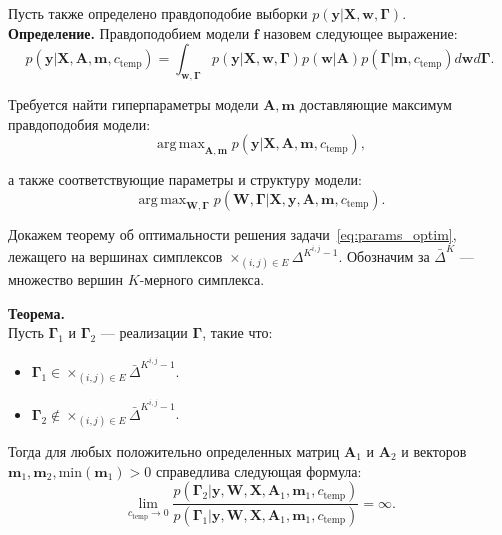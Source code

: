 \documentclass[12pt]{article}
\DeclareMathOperator*{\argmax}{arg\,max}
\begin{document}
Пусть также определено правдоподобие выборки $p(\mathbf{y}|\mathbf{X}, \mathbf{w}, \boldsymbol{\Gamma}).$\\
\textbf{Определение.} Правдоподобием модели $\mathbf{f}$ назовем следующее выражение: 
\begin{equation}
\label{eq:evidence}
	p(\mathbf{y}|\mathbf{X},\mathbf{A},\mathbf{m}, c_{\text{temp}}) = \int_{\mathbf{w}, \boldsymbol{\Gamma} } p(\mathbf{y}|\mathbf{X},\mathbf{w},  \boldsymbol{\Gamma})p(\mathbf{w}|\mathbf{A})p(\boldsymbol{\Gamma}|\mathbf{m}, c_{\text{temp}})d\mathbf{w}d\mathbf{\Gamma}.
\end{equation}

Требуется найти гиперпараметры модели $\mathbf{A}, \mathbf{m}$ доставляющие максимум правдоподобия модели:
\begin{equation}
\label{eq:evidence_optim}
    \argmax_{\mathbf{A}, \mathbf{m}}  p(\mathbf{y}|\mathbf{X},\mathbf{A},\mathbf{m}, {c_\text{temp}}),
\end{equation}

а также соответствующие параметры и структуру модели:
\begin{equation}
\label{eq:params_optim}
    \argmax_{\mathbf{W}, \boldsymbol{\Gamma}}  p(\mathbf{W}, \boldsymbol{\Gamma}|\mathbf{X},\mathbf{y}, \mathbf{A}, \mathbf{m}, {c_\text{temp}}).
\end{equation}



Докажем теорему об оптимальности решения задачи~\eqref{eq:params_optim}, лежащего на вершинах симплексов $\times_{(i,j) \in E} \Delta^{K^{i,j}-1}$. 
Обозначим за $\bar{\Delta}^{K}$ --- множество вершин $K$-мерного симплекса. 

\textbf{Теорема.} \\
Пусть $\boldsymbol{\Gamma}_1$ и $\boldsymbol{\Gamma}_2$ --- реализации $\boldsymbol{\Gamma}$, такие что:
\begin{itemize}
\item $\boldsymbol{\Gamma}_1 \in \times_{(i,j) \in E} \bar{\Delta}^{K^{i,j}-1}$.
\item $\boldsymbol{\Gamma}_2 \not \in \times_{(i,j) \in E} \bar{\Delta}^{K^{i,j}-1}$.
\end{itemize} 
Тогда для любых положительно определенных матриц $\mathbf{A}_1$ и $\mathbf{A}_2$ и векторов $\mathbf{m}_1, \mathbf{m}_2, \text{min}(\mathbf{m}_1)>0$ справедлива следующая формула:
$$\lim_{c_\text{temp} \to 0} \frac{p(\boldsymbol{\Gamma}_2|\mathbf{y}, \mathbf{W}, \mathbf{X},\mathbf{A}_1,\mathbf{m}_1, {c_\text{temp}})}{p(\boldsymbol{\Gamma}_1|\mathbf{y}, \mathbf{W}, \mathbf{X},\mathbf{A}_1,\mathbf{m}_1, {c_\text{temp}})} = \infty.$$
\end{document}
